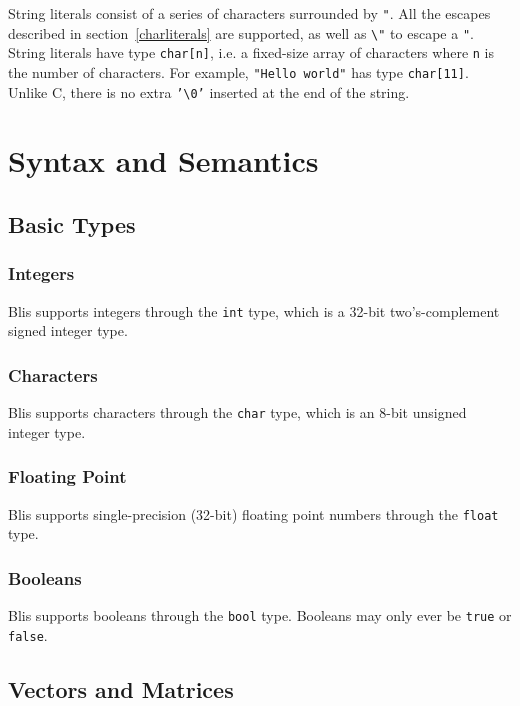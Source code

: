 \documentclass[11pt]{article}
\newcommand{\code}[1]{\texttt{#1}}
\begin{document}
String literals consist of a series of characters surrounded by \code{"}. All the escapes described in section~\ref{charliterals} are supported, as well as \code{\textbackslash{}"} to escape a \code{"}. String literals have type \code{char[n]}, i.e. a fixed-size array of characters where \code{n} is the number of characters. For example, \code{"Hello world"} has type \code{char[11]}. Unlike C, there is no extra \code{'\textbackslash{}0'} inserted at the end of the string.

\section{Syntax and Semantics}

\subsection{Basic Types}

\subsubsection{Integers}

Blis supports integers through the \code{int} type, which is a 32-bit two's-complement signed integer type.

\subsubsection{Characters}

Blis supports characters through the \code{char} type, which is an 8-bit unsigned integer type.

\subsubsection{Floating Point}

Blis supports single-precision (32-bit) floating point numbers through the \code{float} type.

\subsubsection{Booleans}

Blis supports booleans through the \code{bool} type. Booleans may only ever be \code{true} or \code{false}.

\subsection{Vectors and Matrices}
\end{document}
